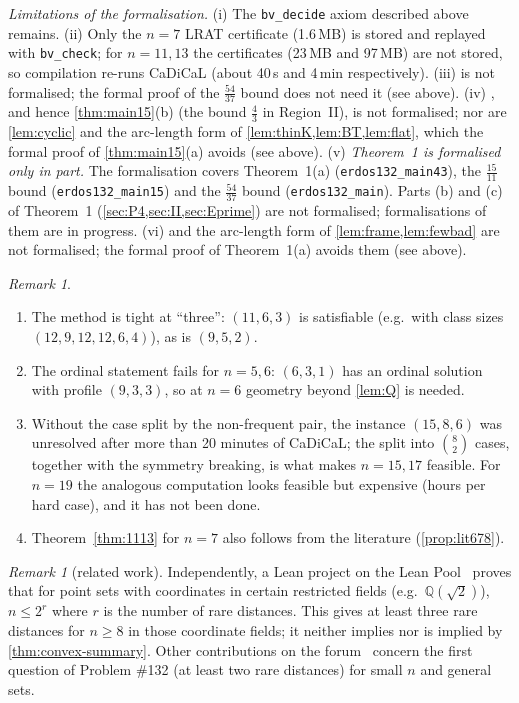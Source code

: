 \documentclass[11pt]{amsart}
\theoremstyle{definition}
\theoremstyle{remark}
\newtheorem{remark}[theorem]{Remark}
\begin{document}
\emph{Limitations of the formalisation.} (i) The \texttt{bv\_decide} axiom described above remains. (ii) Only the $n=7$ LRAT certificate (1.6\,MB) is stored and replayed with \texttt{bv\_check}; for $n=11,13$ the certificates (23\,MB and 97\,MB) are not stored, so compilation re-runs CaDiCaL (about 40\,s and 4\,min respectively). (iii)  is not formalised; the formal proof of the $\frac{54}{37}$ bound does not need it (see above). (iv) , and hence \cref{thm:main15}(b) (the bound $\frac43$ in Region~II), is not formalised; nor are \cref{lem:cyclic} and the arc-length form of \cref{lem:thinK,lem:BT,lem:flat}, which the formal proof of \cref{thm:main15}(a) avoids (see above). (v) \emph{Theorem~1 is formalised only in part.} The formalisation covers Theorem~1(a) (\texttt{erdos132\_main43}), the $\frac{15}{11}$ bound (\texttt{erdos132\_main15}) and the $\frac{54}{37}$ bound (\texttt{erdos132\_main}). Parts (b) and (c) of Theorem~1 (\cref{sec:P4,sec:II,sec:Eprime}) are not formalised; formalisations of them are in progress. (vi)  and the arc-length form of \cref{lem:frame,lem:fewbad} are not formalised; the formal proof of Theorem~1(a) avoids them (see above).

\begin{remark}\label{rem:ordinal}
\begin{enumerate}[leftmargin=2em,label=(\alph*)]
\item The method is tight at ``three'': $(11,6,3)$ is satisfiable (e.g.\ with class sizes $(12,9,12,12,6,4)$), as is $(9,5,2)$.
\item The ordinal statement fails for $n=5,6$: $(6,3,1)$ has an ordinal solution with profile $(9,3,3)$, so at $n=6$ geometry beyond \cref{lem:Q} is needed.
\item Without the case split by the non-frequent pair, the instance $(15,8,6)$ was unresolved after more than 20 minutes of CaDiCaL; the split into $\binom82$ cases, together with the symmetry breaking, is what makes $n=15,17$ feasible. For $n=19$ the analogous computation looks feasible but expensive (hours per hard case), and it has not been done.
\item Theorem~\ref{thm:1113} for $n=7$ also follows from the literature (\cref{prop:lit678}).
\end{enumerate}
\end{remark}

\begin{remark}[related work]
Independently, a Lean project on the Lean Pool~\cite{lyfar} proves that for point sets with coordinates in certain restricted fields (e.g.\ $\mathbb Q(\sqrt2)$), $n\le2^r$ where $r$ is the number of rare distances. This gives at least three rare distances for $n\ge8$ in those coordinate fields; it neither implies nor is implied by \cref{thm:convex-summary}. Other contributions on the forum~\cite{forum132} concern the first question of Problem \#132 (at least two rare distances) for small $n$ and general sets.
\end{remark}
\end{document}

